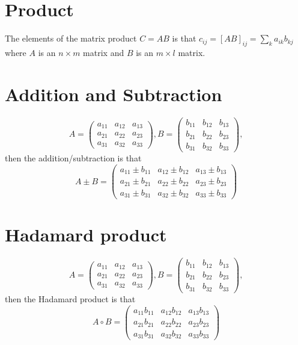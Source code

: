 \documentclass[dvipdfmx]{article}
\begin{document}
\section*{Product}
The elements of the matrix product $C = AB$ is that
$c_{ij} = [AB]_{ij} = {\sum_k}a_{ik}b_{kj}$ 
where $A$ is an $n \times m$ matrix and $B$ is an $m \times l$  matrix.


\section*{Addition and Subtraction}
 \[
   A=
   \left(
   \begin{array}{ccc}
   a_{11} & a_{12} & a_{13} \\
   a_{21} & a_{22}  & a_{23} \\
   a_{31} & a_{32} & a_{33}
   \end{array}
   \right) ,
   B =
   \left(
   \begin{array}{ccc}
   b_{11} & b_{12} & b_{13} \\
   b_{21} & b_{22}  & b_{23} \\
   b_{31} & b_{32} & b_{33}
   \end{array}
   \right) ,
 \]
then the addition/subtraction is that
 \[
   A {\pm} B=
   \left(
   \begin{array}{ccc}
   a_{11}  {\pm} b_{11} & a_{12}  {\pm} b_{12}  & a_{13}  {\pm} b_{13} \\
   a_{21}  {\pm} b_{21} & a_{22}  {\pm} b_{22} & a_{23}  {\pm} b_{23} \\
   a_{31}  {\pm} b_{31} & a_{32}  {\pm} b_{32} & a_{33}  {\pm} b_{33}
   \end{array}
   \right) 
 \]


\section*{Hadamard product}
 \[
   A=
   \left(
   \begin{array}{ccc}
   a_{11} & a_{12} & a_{13} \\
   a_{21} & a_{22}  & a_{23} \\
   a_{31} & a_{32} & a_{33}
   \end{array}
   \right) ,
   B =
   \left(
   \begin{array}{ccc}
   b_{11} & b_{12} & b_{13} \\
   b_{21} & b_{22}  & b_{23} \\
   b_{31} & b_{32} & b_{33}
   \end{array}
   \right) ,
 \]
then the Hadamard product is that
 \[
   A {\circ} B=
   \left(
   \begin{array}{ccc}
   a_{11} b_{11} & a_{12} b_{12}  & a_{13} b_{13} \\
   a_{21} b_{21} & a_{22} b_{22} & a_{23} b_{23} \\
   a_{31} b_{31} & a_{32} b_{32} & a_{33} b_{33}
   \end{array}
   \right) 
 \]
\end{document}
